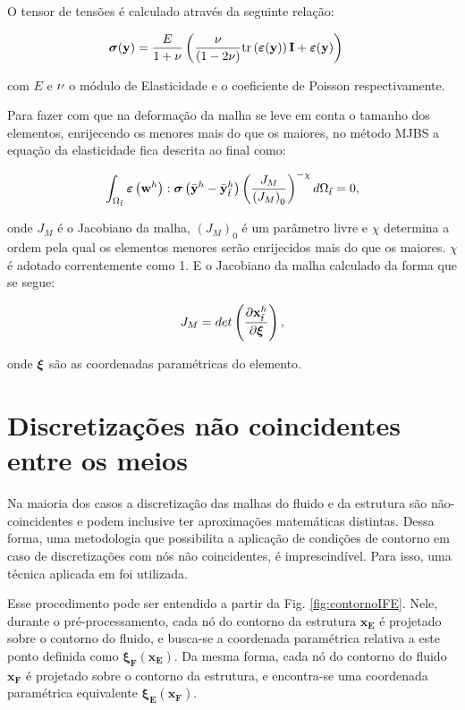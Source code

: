 \documentclass[tese_patricia]{subfiles}
\begin{document}
O tensor de tensões é calculado através da seguinte relação:

\begin{align}
	\boldsymbol{\sigma}(\mathbf{y})
	&=
	\frac{E}{1+\nu}
	\left(
	\frac{\nu}{(1 - 2 \nu)}
	\mathrm{tr}\left(\bm{\varepsilon}(\mathbf{y})\right)\mathbf{I}
	+
	\bm{\varepsilon}(\mathbf{y})
	\right)
\end{align}

\noindent com $E$ e $\nu$ o módulo de Elasticidade e o coeficiente de Poisson respectivamente.

Para fazer com que na deformação da malha se leve em conta o tamanho dos elementos, enrijecendo os menores mais do que os maiores, no método MJBS a equação da elasticidade fica descrita ao final como:

\begin{align}
	\int_{\Omega_{\tilde{t}}} \bm{\varepsilon} \left(\mathbf{w}^h\right) : \boldsymbol{\sigma} \left(\bar{\mathbf{y}}^h- \bar{\mathbf{y}}^h_{\tilde{t}}\right) \left(\frac{J_M}{\left({J_M}\right)_0}\right)^{-\chi} d\Omega_{\tilde{t}} = 0, 
	\label{eq:MJBS}
\end{align}

\noindent onde $J_M$ é o Jacobiano da malha, $(J_M)_0$ é um parâmetro livre e $\chi$ determina a ordem pela qual os elementos menores serão enrijecidos mais do que os maiores.  $\chi$ é adotado correntemente como 1. E o Jacobiano da malha calculado da forma que se segue:

\begin{align}
	J_M = det\left(\frac{\partial\mathbf{x}^h_{\tilde{t}}}{\partial\boldsymbol{\xi}}\right), 
	\label{eq:3}
\end{align}

\noindent onde $\boldsymbol{\xi}$ são as coordenadas paramétricas do elemento.

\section{Discretizações não coincidentes entre os meios}

Na maioria dos casos a discretização das malhas do fluido e da estrutura são não-coincidentes e podem inclusive ter aproximações matemáticas distintas. Dessa forma, uma metodologia que possibilita a aplicação de condições de contorno em caso de discretizações com nós não coincidentes, é imprescindível. Para isso, uma técnica aplicada em  foi utilizada.

Esse procedimento pode ser entendido a partir da Fig. \ref{fig:contornoIFE}. Nele, durante o pré-processamento, cada nó do contorno da estrutura $\mathbf{x_E}$ é projetado sobre o contorno do fluido, e busca-se a coordenada paramétrica relativa a este ponto definida como $\boldsymbol{\xi_{F}}(\mathbf{x_E})$. Da mesma forma, cada nó do contorno do fluido $\mathbf{x_F}$ é projetado sobre o contorno da estrutura, e encontra-se uma coordenada paramétrica equivalente $\boldsymbol{\xi_{E}}(\mathbf{x_F})$. 
\end{document}

